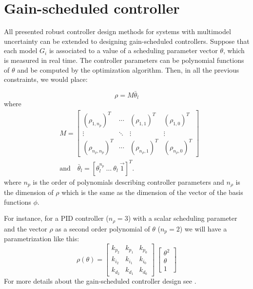 \documentclass [12pt , a4paper] {report}
\begin{document}
\section{Gain-scheduled controller}

All presented robust controller design methods for systems with multimodel uncertainty can be extended to designing
gain-scheduled controllers. Suppose that each model $G_i$ is associated to a value of a scheduling parameter vector $\theta$, which is measured in real time. The controller parameters can be polynomial functions of $\theta$ and be computed by the optimization algorithm. Then, in all the previous constraints, we would place:

\[
\rho=M\bar{\theta}_l
\]
where
\begin{align}
\label{eq:GS}
& M=\left[ \begin{array}{cccc}
(\rho_{1,n_p})^T & \cdots & (\rho_{1,1})^T & (\rho_{1,0})^T \\ [.25 cm]
 \vdots & \ddots & \vdots & \vdots \\ [.25 cm]
(\rho_{n_\rho,n_p})^T & \cdots & (\rho_{n_\rho,1})^T & (\rho_{n_\rho,0})^T \end{array} \right] \\
& \mbox{and} \quad \bar{\theta}_l=[\theta_l^{n_p}\:  \ldots \: \theta_l \: \overrightarrow{1}]^T. \nonumber 
\end{align}
where $n_p$ is the order of polynomials describing controller parameters and $n_\rho$ is the dimension of $\rho$ which is the same as the dimension of the vector of the basis functions $\phi$.

For instance, for a PID controller ($n_\rho=3$) with a scalar scheduling parameter and the vector $\rho$ as a second order polynomial of $\theta$ ($n_p=2$) we will have a parametrization like this:
\begin{equation}
\label{eq:GSPID}
\rho(\theta)=\left[ \begin{array}{ccc}
k_{p_2} & k_{p_1} & k_{p_0} \\ [.25 cm]
k_{i_2} & k_{i_1} & k_{i_0} \\ [.25 cm]
k_{d_2} & k_{d_1} & k_{d_0} \end{array} \right] \: \left[ \begin{array}{c}
\theta^2 \\ [.25 cm]
 \theta \\ [.25 cm]
1 \end{array} \right] 
\end{equation}
For more details about the gain-scheduled controller design see \cite{KKL07e}.
\end{document}
